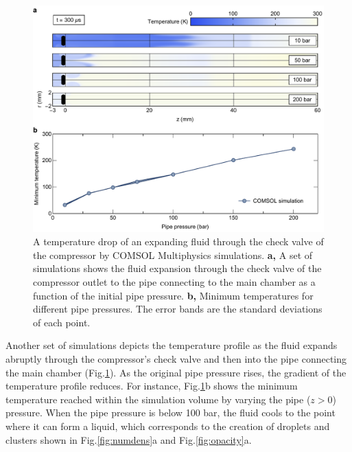 \begin{figure}[t!]
\centering
\includegraphics[width=130mm]{figures/ch2/comsol/comsolCompressor.pdf}
\caption{A temperature drop of an expanding fluid through the check valve of the compressor by COMSOL Multiphysics simulations. \textbf{a,} A set of simulations shows the fluid expansion through the check valve of the compressor outlet to the pipe connecting to the main chamber as a function of the initial pipe pressure. \textbf{b,} Minimum temperatures for different pipe pressures. The error bands are the standard deviations of each point.}
\label{fig:comsolCompressor}
\end{figure}

Another set of simulations depicts the temperature profile as the fluid expands abruptly through the compressor's check valve and then into the pipe connecting the main chamber (Fig.\ref{fig:comsolCompressor}). As the original pipe pressure rises, the gradient of the temperature profile reduces. For instance, Fig.\ref{fig:comsolCompressor}b shows the minimum temperature reached within the simulation volume by varying the pipe ($z>0$) pressure. When the pipe pressure is below 100 bar, the fluid cools to the point where it can form a liquid, which corresponds to the creation of droplets and clusters shown in Fig.\ref{fig:numdens}a and Fig.\ref{fig:opacity}a.

